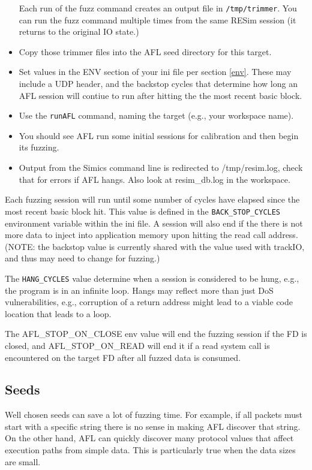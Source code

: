 \documentclass[titlepage]{article}
\begin{document}
\begin{itemize}
Each run of the fuzz command creates an output file in {\tt /tmp/trimmer}.  You can run the fuzz command multiple times from the same 
RESim session (it returns to the original IO state.) 
\item Copy those trimmer files into the AFL seed directory for this target.
\item Set values in the ENV section of your ini file per section \ref{env}.  These may include a UDP header, and the 
backstop cycles that determine how long an AFL session will contiue to run after hitting the the most recent basic block. 
\item Use the {\tt runAFL} command, naming the target (e.g., your workspace name).
\item You should see AFL run some initial sessions for calibration and then begin its fuzzing.
\item Output from the Simics command line is redirected to /tmp/resim.log, check that for errors if AFL hangs.  Also look at resim\_db.log
in the workspace.
\end{itemize}

Each fuzzing session will run until some number of cycles have elapsed since the most recent basic block hit.  This
value is defined in the {\tt BACK\_STOP\_CYCLES} environment variable within the ini file.  A session will also end
if the there is not more data to inject into application memory upon hitting the read call address.
(NOTE: the backstop value is currently shared with the value used with trackIO, and thus may need to change for fuzzing.)

The {\tt HANG\_CYCLES} value determine when a session is considered to be hung, e.g., the program is in an infinite loop.
Hangs may reflect more than just DoS vulnerabilities, e.g., corruption of a return address might lead to a viable code location
that leads to a loop.

The AFL\_STOP\_ON\_CLOSE env value will end the fuzzing session if the FD is closed, and AFL\_STOP\_ON\_READ will end it if
a read system call is encountered on the target FD after all fuzzed data is consumed.

\subsection{Seeds}
Well chosen seeds can save a lot of fuzzing time.  For example, if all packets must start with a specific string there is no sense in
making AFL discover that string.  On the other hand, AFL can quickly discover many protocol values that affect execution paths from simple
data.  This is particularly true when the data sizes are small.  
\end{document}
